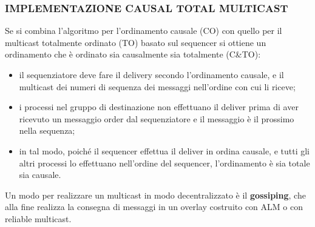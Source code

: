 \subsubsection{IMPLEMENTAZIONE CAUSAL TOTAL MULTICAST}
Se si combina l'algoritmo per l'ordinamento causale (CO) con quello per il multicast totalmente ordinato (TO) basato sul sequencer si ottiene un ordinamento che è ordinato sia causalmente sia totalmente (C\&TO):
\begin{itemize}
    \item il sequenziatore deve fare il delivery secondo l'ordinamento causale, e il multicast dei numeri di sequenza dei messaggi nell'ordine con cui li riceve;
    \item i processi nel gruppo di destinazione non effettuano il deliver prima di aver ricevuto un messaggio order dal sequenziatore e il messaggio è il prossimo nella sequenza;
    \item in tal modo, poiché il sequencer effettua il deliver in ordina causale, e tutti gli altri processi lo effettuano nell'ordine del sequencer, l'ordinamento è sia totale sia causale.
\end{itemize}
Un modo per realizzare un multicast in modo decentralizzato è il \textbf{gossiping}, che alla fine realizza la consegna di messaggi in un overlay costruito con ALM o con reliable multicast.


